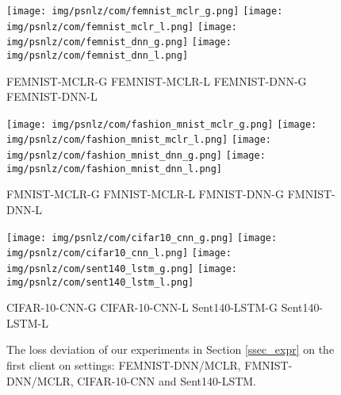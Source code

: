 \documentclass{article}
\begin{document}
\begin{figure*}[ht]
    \centering
    \texttt{[image: img/psnlz/com/femnist\_mclr\_g.png]}
    \texttt{[image: img/psnlz/com/femnist\_mclr\_l.png]}
    \texttt{[image: img/psnlz/com/femnist\_dnn\_g.png]}
    \texttt{[image: img/psnlz/com/femnist\_dnn\_l.png]}
    \begin{center}
        \footnotesize 
        FEMNIST-MCLR-G \qquad\qquad\qquad FEMNIST-MCLR-L
        \qquad\qquad\qquad\qquad
        FEMNIST-DNN-G \qquad\qquad\qquad FEMNIST-DNN-L
    \end{center}
    \texttt{[image: img/psnlz/com/fashion\_mnist\_mclr\_g.png]}
    \texttt{[image: img/psnlz/com/fashion\_mnist\_mclr\_l.png]}
    \texttt{[image: img/psnlz/com/fashion\_mnist\_dnn\_g.png]}
    \texttt{[image: img/psnlz/com/fashion\_mnist\_dnn\_l.png]}
    \begin{center}
        \footnotesize 
        FMNIST-MCLR-G \qquad\qquad\qquad FMNIST-MCLR-L
        \qquad\qquad\qquad\qquad
        FMNIST-DNN-G \qquad\qquad\qquad FMNIST-DNN-L
    \end{center}
    \texttt{[image: img/psnlz/com/cifar10\_cnn\_g.png]}
    \texttt{[image: img/psnlz/com/cifar10\_cnn\_l.png]}
    \texttt{[image: img/psnlz/com/sent140\_lstm\_g.png]}
    \texttt{[image: img/psnlz/com/sent140\_lstm\_l.png]}
    \begin{center}
        \footnotesize 
        CIFAR-10-CNN-G \qquad\qquad\qquad CIFAR-10-CNN-L
        \qquad\qquad\qquad\qquad
        Sent140-LSTM-G \qquad\qquad\qquad Sent140-LSTM-L
    \end{center}
    \caption{The loss deviation of our experiments in Section \ref{ssec_expr} on the first client on settings: FEMNIST-DNN/MCLR, FMNIST-DNN/MCLR, CIFAR-10-CNN and Sent140-LSTM.}
    \label{appdx_fig_psnlz_com}
\end{figure*}
\end{document}
